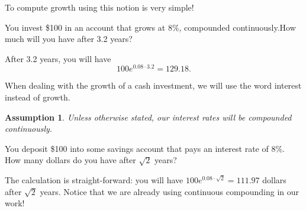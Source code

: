\documentclass{ximera}
\newtheorem{ass}{Assumption}
\begin{document}
To compute growth using this notion is very simple!

\begin{example}
You invest \$100 in an account that grows at 8\%, compounded continuously.How much will you have after 3.2 years? 
\end{example}

\begin{solution}
After 3.2 years, you will have
	\begin{equation*}
		100e^{0.08\cdot 3.2}=129.18.
	\end{equation*}
\end{solution}

\begin{remark}
When dealing with the growth of a cash investment, we will use the word interest instead of growth. 
\end{remark}

\begin{ass}
Unless otherwise stated, our interest rates will be compounded continuously.
\end{ass}

\begin{question}
You deposit \$100 into some savings account that pays an interest rate of 8\%. How many dollars do you have after $\sqrt{2}$ years?
	\begin{multipleChoice}
	\end{multipleChoice}
\end{question}

\begin{solution}
The calculation is straight-forward: you will have $100e^{0.08\cdot\sqrt{2}}=111.97$ dollars after $\sqrt{2}$ years. Notice that we are already using continuous compounding in our work!
\end{solution}
\end{document}
